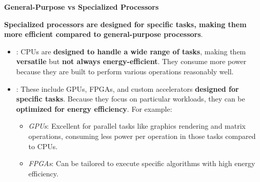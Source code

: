 \highspace
\begin{flushleft}
    \textcolor{Green3}{ \textbf{General-Purpose vs Specialized Processors}}
\end{flushleft}
\textbf{Specialized processors are designed for specific tasks, making them more efficient compared to general-purpose processors}.
\begin{itemize}
    \item {}: CPUs are \textbf{designed to handle a wide range of tasks}, making them \textbf{versatile} but \textbf{not always energy-efficient}. They consume more power because they are built to perform various operations reasonably well.

    \item {}: These include GPUs, FPGAs, and custom accelerators \textbf{designed for specific tasks}. Because they focus on particular workloads, they can be \textbf{optimized for energy efficiency}. For example:
    \begin{itemize}
        \item \emph{GPUs}: Excellent for parallel tasks like graphics rendering and matrix operations, consuming less power per operation in those tasks compared to CPUs.
        \item \emph{FPGAs}: Can be tailored to execute specific algorithms with high energy efficiency.
    \end{itemize}
\end{itemize}
